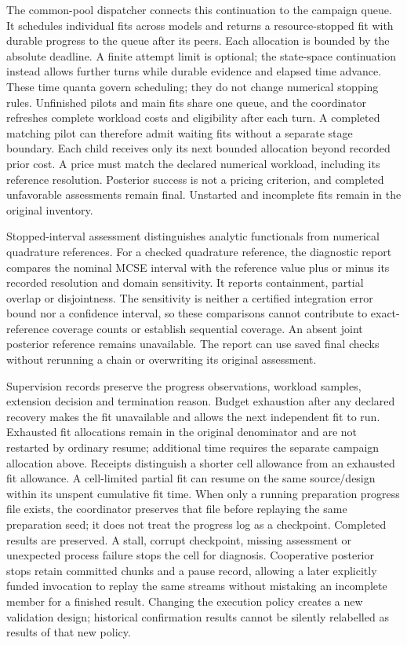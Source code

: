The common-pool dispatcher connects this continuation to the campaign queue.
It schedules individual fits across models and returns a resource-stopped fit
with durable progress to the queue after its peers. Each allocation is bounded
by the absolute deadline. A finite attempt limit is optional; the state-space
continuation instead allows further turns while durable evidence and elapsed
time advance. These time quanta govern scheduling; they do not change numerical
stopping rules. Unfinished pilots and main fits share one queue, and the
coordinator refreshes complete workload costs and eligibility after each turn.
A completed matching pilot can therefore admit waiting fits without a separate
stage boundary. Each child receives only its next bounded allocation beyond
recorded prior cost. A price must match the declared numerical workload,
including its reference resolution. Posterior success is not a pricing
criterion, and completed unfavorable assessments remain final. Unstarted and
incomplete fits remain in the original inventory.

Stopped-interval assessment distinguishes analytic functionals from numerical
quadrature references. For a checked quadrature reference, the diagnostic report
compares the nominal MCSE interval with the reference value plus or minus its
recorded resolution and domain sensitivity. It reports containment, partial
overlap or disjointness. The sensitivity is neither a certified integration
error bound nor a confidence interval, so these comparisons cannot contribute
to exact-reference coverage counts or establish sequential coverage. An absent
joint posterior reference remains unavailable. The report can use saved final
checks without rerunning a chain or overwriting its original assessment.

Supervision records preserve the progress observations, workload samples,
extension decision and termination reason. Budget exhaustion after any declared
recovery makes the fit unavailable and allows the next independent fit to run. Exhausted fit
allocations remain in the original denominator and are not restarted by ordinary
resume; additional time requires the separate campaign allocation above. Receipts
distinguish a shorter cell allowance from an exhausted fit allowance. A
cell-limited partial fit can resume on the same source/design within its
unspent cumulative fit time. When only a running preparation progress file
exists, the coordinator preserves that file before replaying the same
preparation seed; it does not treat the progress log as a checkpoint.
Completed results are preserved. A stall, corrupt
checkpoint, missing assessment or unexpected process failure stops the cell
for diagnosis. Cooperative posterior stops retain committed chunks and a pause
record, allowing a later explicitly funded invocation to replay the same
streams without mistaking an incomplete member for a finished result. Changing
the execution policy creates a new validation design; historical confirmation
results cannot be silently relabelled as results of that new policy.

